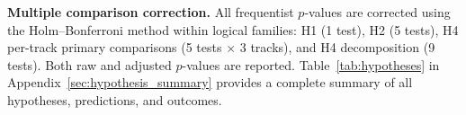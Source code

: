 \textbf{Multiple comparison correction.} All frequentist $p$-values are corrected using the Holm--Bonferroni method within logical families: H1 (1 test), H2 (5 tests), H4 per-track primary comparisons (5 tests $\times$ 3 tracks), and H4 decomposition (9 tests). Both raw and adjusted $p$-values are reported. Table~\ref{tab:hypotheses} in Appendix~\ref{sec:hypothesis_summary} provides a complete summary of all hypotheses, predictions, and outcomes.
